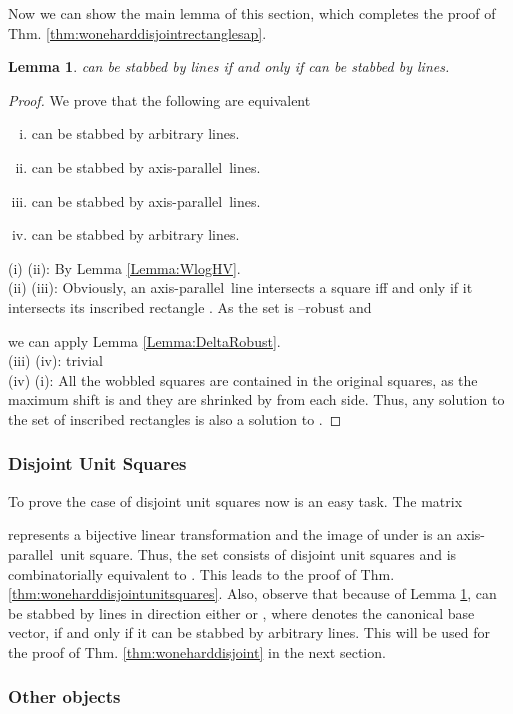 \documentclass[12pt]{article}
\newtheorem{lemma}[definition]{Lemma}
\newcommand{\ap}{a.p.\ }
\renewcommand{\ap}{axis-parallel\ }
\begin{document}
Now we can show the main lemma of this section, which completes the proof of Thm. \ref{thm:woneharddisjointrectanglesap}.
\begin{lemma}\label{lemma:disjointRectanglesAP}  can be stabbed by  lines if and only if  can be stabbed by  lines.
\end{lemma}
\begin{proof} We prove that the following are equivalent
\begin{enumerate}[(i)]
	\item  can be stabbed by  arbitrary lines.
	\item  can be stabbed by  \ap lines.
	\item  can be stabbed by  \ap lines.
	\item  can be stabbed by  arbitrary lines.
\end{enumerate}
(i)  (ii): By Lemma \ref{Lemma:WlogHV}.\\
(ii)  (iii): Obviously, an \ap line intersects a square iff and only if it intersects its inscribed rectangle . As the set  is --robust and
 
we can apply Lemma \ref{Lemma:DeltaRobust}.\\
(iii)  (iv): trivial\\
(iv)  (i): All the wobbled squares are contained in the original squares, as the maximum shift is  and they are shrinked by  from each side. Thus, any solution to the set of inscribed rectangles  is also a solution to .
\end{proof}

\subsubsection{Disjoint Unit Squares}
To prove the case of disjoint unit squares now is an easy task. The matrix 

represents a bijective linear transformation and the image of  under  is an \ap unit square. Thus, the set  consists of disjoint unit squares and is combinatorially equivalent to . This leads to the proof of Thm. \ref{thm:woneharddisjointunitsquares}. Also, observe that because of Lemma \ref{lemma:disjointRectanglesAP},  can be stabbed by  lines in direction either  or , where  denotes the canonical base vector, if and only if it can be stabbed by  arbitrary lines. This will be used for the proof of Thm. \ref{thm:woneharddisjoint} in the next section. 
\subsubsection{Other objects}
\end{document}
